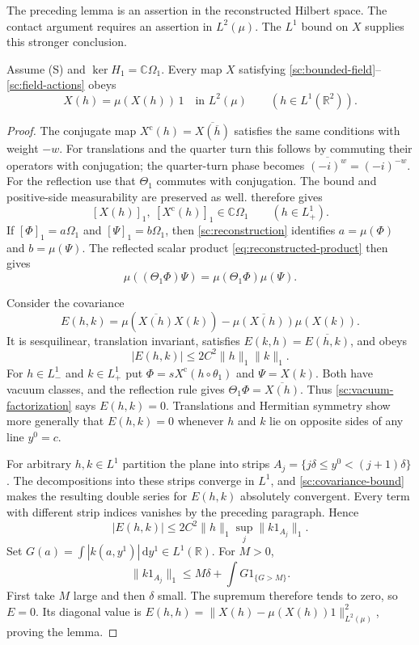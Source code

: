 \documentclass[11pt,letterpaper,reqno]{amsart}
\makeatletter
\theoremstyle{definition}
\newcommand{\ms@minorstart}{%
  \pushQED{\qed}\renewcommand{\qedsymbol}{$\blacksquare$}}
\newenvironment{lemma}[1][]{\ms@minorstart\ms@lemma[#1]}
  {\popQED\endms@lemma}
\theoremstyle{remark}
\makeatother
\begin{document}
The preceding lemma is an assertion in the reconstructed Hilbert space.
The contact argument requires an assertion in $L^2(\mu)$. The $L^1$ bound
on $X$ supplies this stronger conclusion.

\begin{lemma}[Constancy of bounded local fields]\label{sc:constant-field}
Assume \textup{(S)} and $\ker H_1=\mathbb C\Omega_1$.
Every map $X$ satisfying
\eqref{sc:bounded-field}--\eqref{sc:field-actions} obeys
\[
X(h)=\mu(X(h))\,1\quad\text{in }L^2(\mu)
\qquad(h\in L^1(\mathbb R^2)).
\]
\end{lemma}

\begin{proof}
The conjugate map $X^{\mathrm c}(h)=\overline{X(\overline h)}$
satisfies the same conditions with weight $-w$. For translations and the
quarter turn this follows by commuting their operators with conjugation;
the quarter-turn phase becomes $\overline{(-i)^w}=(-i)^{-w}$.
For the reflection use that $\Theta_1$ commutes with conjugation.
The bound and positive-side measurability are preserved as well.
 therefore gives
\[
[X(h)]_1,\ [X^{\mathrm c}(h)]_1\in\mathbb C\Omega_1
\qquad(h\in L^1_+).
\]
If $[\Phi]_1=a\Omega_1$ and $[\Psi]_1=b\Omega_1$, then
\eqref{sc:reconstruction} identifies $a=\mu(\Phi)$ and $b=\mu(\Psi)$.
The reflected scalar product \eqref{eq:reconstructed-product} then gives
\begin{equation}\label{sc:vacuum-factorization}
\mu((\Theta_1\Phi)\Psi)=\mu(\Theta_1\Phi)\mu(\Psi).
\end{equation}

Consider the covariance
\[
E(h,k)=\mu(\overline{X(h)}X(k))
 -\overline{\mu(X(h))}\mu(X(k)).
\]
It is sesquilinear, translation invariant, satisfies
$E(k,h)=\overline{E(h,k)}$, and obeys
\begin{equation}\label{sc:covariance-bound}
|E(h,k)|\le2C^2\|h\|_1\|k\|_1.
\end{equation}
For $h\in L^1_-$ and $k\in L^1_+$ put
$\Phi=sX^{\mathrm c}(h\circ\theta_1)$ and $\Psi=X(k)$.
Both have vacuum classes, and the reflection rule gives
$\Theta_1\Phi=\overline{X(h)}$. Thus
\eqref{sc:vacuum-factorization} says $E(h,k)=0$.
Translations and Hermitian symmetry show more generally that $E(h,k)=0$
whenever $h$ and $k$ lie on opposite sides of any line $y^0=c$.

For arbitrary $h,k\in L^1$ partition the plane into strips
$A_j=\{j\delta\le y^0<(j+1)\delta\}$.
The decompositions into these strips converge in $L^1$, and
\eqref{sc:covariance-bound} makes the resulting double series for $E(h,k)$
absolutely convergent. Every term with different strip indices vanishes by
the preceding paragraph. Hence
\[
|E(h,k)|\le2C^2\|h\|_1\sup_j\|k1_{A_j}\|_1.
\]
Set $G(a)=\int|k(a,y^1)|\,\mathrm dy^1\in L^1(\mathbb R)$.
For $M>0$,
\[
\|k1_{A_j}\|_1\le M\delta+\int G1_{\{G>M\}}.
\]
First take $M$ large and then $\delta$ small. The supremum therefore tends
to zero, so $E=0$. Its diagonal value is
$E(h,h)=\|X(h)-\mu(X(h))1\|_{L^2(\mu)}^2$, proving the lemma.
\end{proof}
\end{document}
